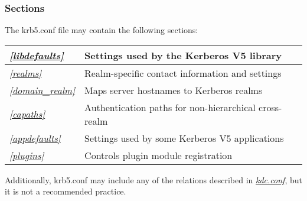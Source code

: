 \documentclass[letterpaper,10pt,english]{sphinxmanual}
\begin{document}
\subsubsection{Sections}
\label{admin/conf_files/krb5_conf:sections}
The krb5.conf file may contain the following sections:

\begin{tabulary}{\linewidth}{|L|L|}
\hline

{\hyperref[admin/conf_files/krb5_conf:libdefaults]{\emph{{[}libdefaults{]}}}}
 & 
Settings used by the Kerberos V5 library
\\
\hline
{\hyperref[admin/conf_files/krb5_conf:realms]{\emph{{[}realms{]}}}}
 & 
Realm-specific contact information and settings
\\
\hline
{\hyperref[admin/conf_files/krb5_conf:domain-realm]{\emph{{[}domain\_realm{]}}}}
 & 
Maps server hostnames to Kerberos realms
\\
\hline
{\hyperref[admin/conf_files/krb5_conf:capaths]{\emph{{[}capaths{]}}}}
 & 
Authentication paths for non-hierarchical cross-realm
\\
\hline
{\hyperref[admin/conf_files/krb5_conf:appdefaults]{\emph{{[}appdefaults{]}}}}
 & 
Settings used by some Kerberos V5 applications
\\
\hline
{\hyperref[admin/conf_files/krb5_conf:plugins]{\emph{{[}plugins{]}}}}
 & 
Controls plugin module registration
\\
\hline\end{tabulary}


Additionally, krb5.conf may include any of the relations described in
{\hyperref[admin/conf_files/kdc_conf:kdc-conf-5]{\emph{kdc.conf}}}, but it is not a recommended practice.
\end{document}
